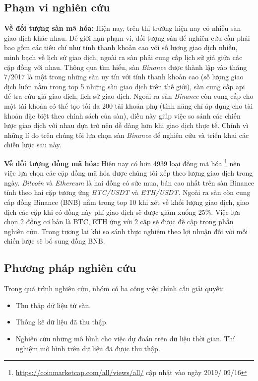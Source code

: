\subsection{Phạm vi nghiên cứu}
\textbf{Về đối tượng sàn mã hóa:} Hiện nay, trên thị trường hiện nay có nhiều sàn giao dịch khác nhau. Để giới hạn phạm vi, đối tượng sàn để nghiên cứu cần phải bao gồm các tiêu chí như tính thanh khoản cao với số lượng giao dịch nhiều, minh bạch về lịch sử giao dịch, ngoài ra sàn phải cung cấp lịch sử giá giữa các cặp đồng với nhau. Thông qua tìm hiểu, sàn \textit{Binance} được thành lập vào tháng 7/2017 là một trong những sàn uy tín với tính thanh khoản cao (số lượng giao dịch luôn nằm trong top 5 những sàn giao dịch trên thế giới), sàn cung cấp api để tra cứu giá giao dịch, lịch sử giao dịch. Ngoài ra sàn \textit{Binance} còn cung cấp cho một tài khoản có thể tạo tối đa 200 tài khoản phụ (tính năng chỉ áp dụng cho tài khoản đặc biệt theo chính sách của sàn), điều này giúp việc so sánh các chiến lược giao dịch với nhau dựa trở nên dễ  dàng hơn khi giao dịch thực tế. Chính vì những lí do trên chúng tôi lựa chọn sàn \textit{Binance} để nghiên cứu và triển khai các chiến lược sau này.

\textbf{Về đối tượng đồng mã hóa:} Hiện nay có hơn 4939 loại đồng mã hóa \footnote{\url{https://coinmarketcap.com/all/views/all/} cập nhật vào ngày 2019/
09/16} nên việc lựa chọn các cặp đồng mã hóa được chúng tôi xếp theo lượng giao dịch trong ngày. \textit{Bitcoin} và \textit{Ethereum} là hai đồng có sức mua, bán cao nhất trên sàn Binance tính theo hai cặp tương ứng \textit{BTC/USDT} và \textit{ETH/USDT}. Ngoài ra sàn còn cung cấp đồng Binance (BNB) nằm trong top 10 khi xét về  khối lượng giao dịch, giao dịch các cặp khi có đồng này phí giao dịch sẽ được giảm xuống 25\%. Việc lựa chọn 2 đồng cơ bản là BTC, ETH ứng với 2 cặp sẽ được đề cập trong phần nghiên cứu. Trong tương lai khi so sánh thực nghiệm theo lợi nhuận đối với mỗi chiến lược sẽ bổ sung đồng BNB.

\subsection{Phương pháp nghiên cứu}
Trong quá trình nghiên cứu, nhóm có ba công việc chính cần giải quyết:
\begin{itemize}
    \item Thu thập dữ liệu từ sàn.
    \item Thống kê dữ liệu đã thu thập.
    \item Nghiên cứu những mô hình cho việc dự đoán trên dữ liệu thời gian. Thí nghiệm mô hình trên dữ liệu đã được thu thập.
\end{itemize}

